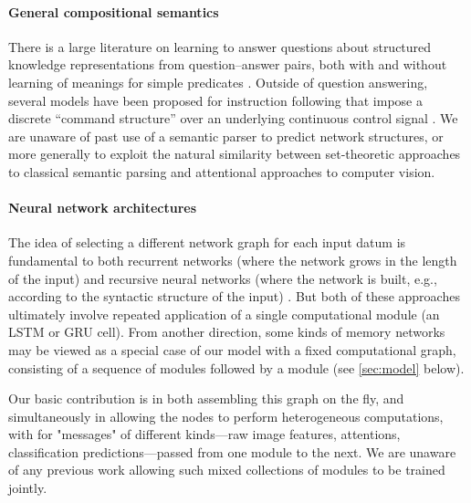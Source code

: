 \paragraph{General compositional semantics}

There is a large literature on learning to answer questions about structured
knowledge representations from question--answer pairs, both with and without
learning of meanings for simple predicates \cite{Liang13DCS,Krish2013Grounded}.
Outside of question answering, several models have been proposed for instruction
following that impose a discrete ``command structure'' over an underlying
continuous control signal \cite{Andreas14Paths,matuszek12icml}.  We are unaware
of past use of a semantic parser to predict network structures, or more
generally to exploit the natural similarity between set-theoretic approaches to
classical semantic parsing and attentional approaches to computer vision.

\paragraph{Neural network architectures}

The idea of selecting a different network graph for each input datum is
fundamental to both recurrent networks (where the network grows in the length of
the input) \cite{Elman90RNN} and recursive neural networks (where the network is
built, e.g., according to the syntactic structure of the input)
\cite{Socher13CVG}. But both of these approaches ultimately involve repeated
application of a single computational module (\eg an LSTM
\cite{Hochreiter97LSTM} or GRU \cite{Cho14GRU} cell).  From another direction,
some kinds of memory networks \cite{Weston14MemNet} may be viewed as a special
case of our model with a fixed computational graph, consisting of a sequence of
 modules followed by a  module (see
\autoref{sec:model} below).

Our basic contribution is in both assembling this graph on the fly, and
simultaneously in allowing the nodes to perform heterogeneous computations, with
for "messages" of different kinds---raw image features, attentions,
classification predictions---passed from one module to the next. We are unaware
of any previous work allowing such mixed collections of modules to be trained
jointly. 
